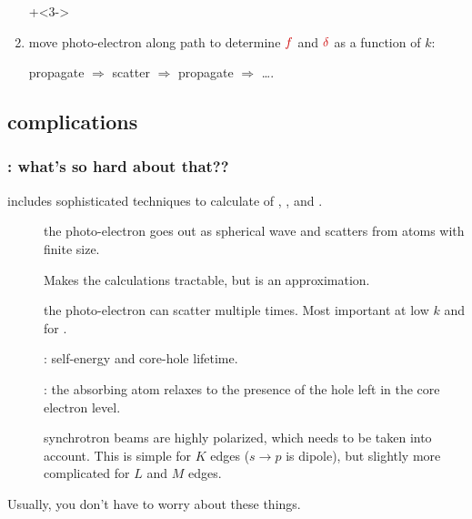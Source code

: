 \begin{frame}
\begin{enumerate}
  \onslide+<3->\item move photo-electron along path to determine
    $\Red{f}$ and $\Red{\delta}$ as a function of $k$:

    \begin{center}
      propagate $\Rightarrow$ scatter $\Rightarrow$ propagate $\Rightarrow$ \ldots.
    \end{center}

  \end{enumerate}

\end{frame}

\subsection{{\feff}   complications}
\begin{frame} \frametitle{{\feff}: what's so hard about that??}

  \begin{cenpage}{105mm}
    {\feff} includes sophisticated techniques to calculate of ,
    , and .

    \begin{description}
    \item[] the photo-electron goes out as
      spherical wave and scatters from atoms with finite size.

    \item[] Makes the calculations
      tractable, but is an approximation.

    \item[]  the photo-electron can scatter
      multiple times. Most important at low $k$ and for .

    \item[] {}: self-energy and
      core-hole lifetime.

    \item[] {}: the absorbing atom
      relaxes to the presence of the hole left in the core electron level.

    \item[] synchrotron beams are highly
      polarized, which needs to be taken into account.  This is simple for
      $K$ edges ($s\rightarrow p$ is dipole), but slightly more complicated for
      $L$ and $M$ edges.

    \end{description}

    \end{cenpage}
\vmm
\begin{center} Usually, you don't have to worry about these things.\end{center}

\end{frame}


